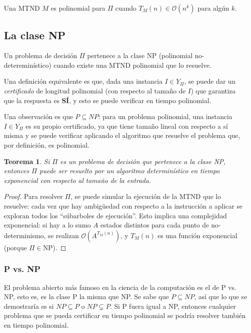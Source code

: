 \documentclass[a4paper]{report}
\newcommand{\BigO}[1]{\ensuremath{\mathcal{O}(#1)}}
\newtheorem*{theorem*}{Teorema}
\begin{document}
Una MTND $M$ es polinomial para $\Pi$ cuando $T_M(n) \in \BigO{n^k}$ para algún $k$.

\subsection{La clase NP}

Un problema de decisión $\Pi$ pertenece a la clase NP (polinomial no-detereminístico) cuando existe una MTND polinomial que lo resuelve.

Una definición equivalente es que, dada una instancia $I \in Y_{\Pi}$, se puede dar un \textit{certificado} de longitud polinomial (con respecto al tamaño de $I$) que garantiza que la respuesta es \textbf{SÍ}, y esto se puede verificar en tiempo polinomial.

Una observación es que $P \subseteq NP$: para un problema polinomial, una instancia $I \in Y_{\Pi}$ es su propio certificado, ya que tiene tamaño lineal con respecto a sí misma y se puede verificar aplicando el algoritmo que resuelve el problema que, por definición, es polinomial.

\begin{theorem*}
    Si $\Pi$ es un problema de decisión que pertenece a la clase NP, entonces $\Pi$ puede ser resuelto por un algoritmo determinístico en tiempo exponencial con respecto al tamaño de la entrada.
\end{theorem*}
\begin{proof}
    Para resolver $\Pi$, se puede simular la ejecución de la MTND que lo resuelve: cada vez que hay ambigüedad con respecto a la instrucción a aplicar se exploran todos los ``súbarboles de ejecución''. Esto implica una complejidad exponencial: si hay a lo sumo $A$ estados distintos para cada punto de no-determinismo, se realizan \BigO{A^{T_M(n)}}, y $T_M(n)$ es una función exponencial (porque $\Pi \in \text{NP}$).
\end{proof}

\subsubsection{P vs. NP}

El problema abierto más famoso en la ciencia de la computación es el de P vs. NP, esto es, es la clase P la misma que NP. Se sabe que $P \subseteq NP$, así que lo que se demostraría es si $NP \subseteq P$ o $NP \subsetneq P$. Si P fuera igual a NP, entonces cualquier problema que se pueda certificar en tiempo polinomial se podría resolver también en tiempo polinomial.
\end{document}
